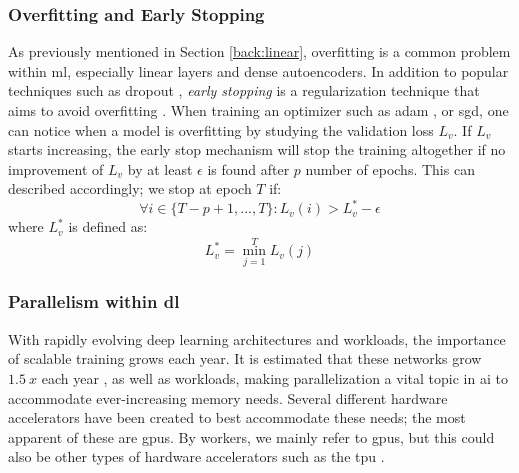 \subsubsection{Overfitting and Early Stopping}
%
As previously mentioned in Section \ref{back:linear}, overfitting is a common problem within \acrlong{ml}, especially linear layers and dense autoencoders. In addition to popular techniques such as dropout \cite{srivastava2014dropout}, \textit{early stopping} is a regularization technique that aims to avoid overfitting \cite{prechelt2002early}. When training an optimizer such as \acrshort{adam} \cite{kingma2017adam}, or \acrshort{sgd}, one can notice when a model is overfitting by studying the validation loss $L_v$. If $L_v$ starts increasing, the early stop mechanism will stop the training altogether if no improvement of $L_v$ by at least $\epsilon$ is found after $p$ number of epochs. This can described accordingly; we stop at epoch $T$ if:
\begin{equation}
\forall i \in \{T-p+1, ..., T\}: L_v(i) > L_v^* - \epsilon
\end{equation}
where $L_v^*$ is defined as:
\begin{equation}
L_v^* = \min_{j=1}^{T} L_v(j)
\end{equation}
\subsubsection{Parallelism within \acrlong{dl}}
With rapidly evolving deep learning architectures and workloads, the importance of scalable training grows each year. It is estimated that these networks grow $\qty{1.5}{x}$ each year \cite{9499913}, as well as workloads, making parallelization a vital topic in \acrshort{ai} to accommodate ever-increasing memory needs. Several different hardware accelerators have been created to best accommodate these needs; the most apparent of these are \acrshort{gpu}s. By workers, we mainly refer to \acrshort{gpu}s, but this could also be other types of hardware accelerators such as the \acrfull{tpu} \cite{jouppi2023tpu}.
